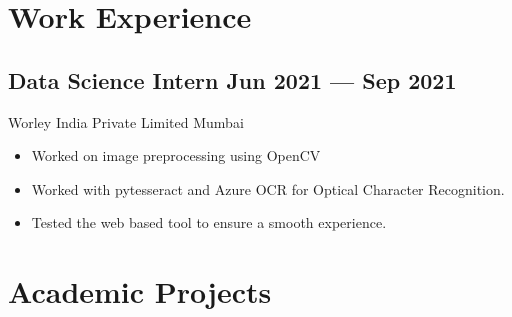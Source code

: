 \documentclass[10pt]{article}
\newcommand{\subtext}[1]{
#1\par\vspace{-0.2cm}}
\newenvironment{zitemize}{
\begin{itemize}\itemsep2pt \parskip0pt \parsep1pt}
{\end{itemize}\vspace{-0.5cm}}
\begin{document}
\section{Work Experience}

\subsection*{Data Science Intern \hfill Jun 2021 --- Sep 2021} 
\subtext{Worley India Private Limited \hfill Mumbai} 
    \begin{zitemize}
        \item Worked on image preprocessing using OpenCV
        \item Worked with pytesseract and Azure OCR for Optical Character Recognition.
        \item Tested the web based tool to ensure a smooth experience.
    \end{zitemize}




\section{Academic Projects} %
\end{document}
